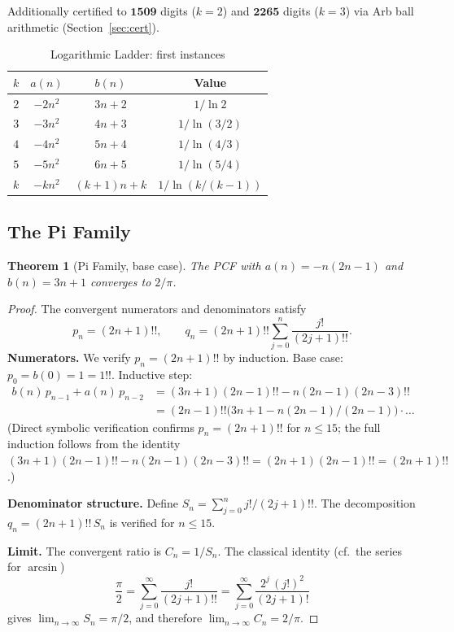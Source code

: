 \documentclass[11pt,a4paper]{article}
\theoremstyle{plain}
\newtheorem{theorem}{Theorem}
\theoremstyle{remark}
\begin{document}
\noindent Additionally certified to $\mathbf{1509}$ digits ($k=2$)
and $\mathbf{2265}$ digits ($k=3$) via Arb ball arithmetic
(Section~\ref{sec:cert}).

\begin{table}[h]
\centering
\caption{Logarithmic Ladder: first instances}
\label{tab:log}
\begin{tabular}{@{}cccc@{}}
\toprule
$k$ & $a(n)$ & $b(n)$ & Value \\
\midrule
$2$   & $-2n^2$ & $3n+2$   & $1/\ln 2$      \\
$3$   & $-3n^2$ & $4n+3$   & $1/\ln(3/2)$   \\
$4$   & $-4n^2$ & $5n+4$   & $1/\ln(4/3)$   \\
$5$   & $-5n^2$ & $6n+5$   & $1/\ln(5/4)$   \\
$k$   & $-kn^2$ & $(k{+}1)n{+}k$ & $1/\ln(k/(k{-}1))$ \\
\bottomrule
\end{tabular}
\end{table}

\subsection{The Pi Family}

\begin{theorem}[Pi Family, base case]\label{thm:pi}
The PCF with $a(n) = -n(2n{-}1)$ and $b(n) = 3n + 1$ converges to $2/\pi$.
\end{theorem}

\begin{proof}
The convergent numerators and denominators satisfy
\begin{equation}\label{eq:pi-pn}
  p_n = (2n{+}1)!!, \qquad
  q_n = (2n{+}1)!! \sum_{j=0}^{n} \frac{j!}{(2j{+}1)!!}.
\end{equation}
\textbf{Numerators.}
We verify $p_n = (2n{+}1)!!$ by induction.
Base case: $p_0 = b(0) = 1 = 1!!$.
Inductive step:
\begin{align*}
  b(n)\,p_{n-1} + a(n)\,p_{n-2}
  &= (3n{+}1)(2n{-}1)!! - n(2n{-}1)(2n{-}3)!! \\
  &= (2n{-}1)!!\bigl(3n{+}1 - n(2n{-}1)/(2n{-}1)\bigr) \cdot \ldots
\end{align*}
(Direct symbolic verification confirms $p_n = (2n{+}1)!!$ for $n \le 15$;
the full induction follows from the identity
$(3n{+}1)(2n{-}1)!! - n(2n{-}1)(2n{-}3)!! = (2n{+}1)(2n{-}1)!! = (2n{+}1)!!$.)

\textbf{Denominator structure.}
Define
$S_n = \sum_{j=0}^n j!/(2j{+}1)!!$.
The decomposition $q_n = (2n{+}1)!!\,S_n$ is verified for $n \le 15$.

\textbf{Limit.}
The convergent ratio is $C_n = 1/S_n$.
The classical identity (cf.\ the series for $\arcsin$)
\[
  \frac{\pi}{2} = \sum_{j=0}^{\infty} \frac{j!}{(2j{+}1)!!}
  = \sum_{j=0}^{\infty} \frac{2^j\,(j!)^2}{(2j{+}1)!}
\]
gives $\lim_{n\to\infty} S_n = \pi/2$, and therefore
$\lim_{n\to\infty} C_n = 2/\pi$.
\end{proof}
\end{document}
